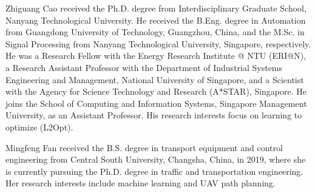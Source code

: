 \documentclass[lettersize,journal]{IEEEtran}
\begin{document}
	\begin{IEEEbiography}{Zhiguang Cao} received the Ph.D. degree from Interdisciplinary Graduate School, Nanyang Technological University. He received the B.Eng. degree in Automation from Guangdong University of Technology, Guangzhou, China, and the M.Sc. in Signal Processing from Nanyang Technological University, Singapore, respectively. He was a Research Fellow with the Energy Research Institute @ NTU (ERI@N), a Research Assistant Professor with the Department of Industrial Systems Engineering and Management, National University of Singapore, and a Scientist with the Agency for Science Technology and Research (A*STAR), Singapore. He joins the School of Computing and Information Systems, Singapore Management University, as an Assistant Professor. His research interests focus on learning to optimize (L2Opt).
	\end{IEEEbiography}
	
	\begin{IEEEbiography}{Mingfeng Fan}{\space}
		received the B.S. degree in transport equipment and control engineering from Central South University, Changsha, China, in 2019, where she is currently pursuing the Ph.D. degree in traffic and transportation engineering. Her research interests include machine learning and UAV path planning.
	\end{IEEEbiography}
	
\end{document}

